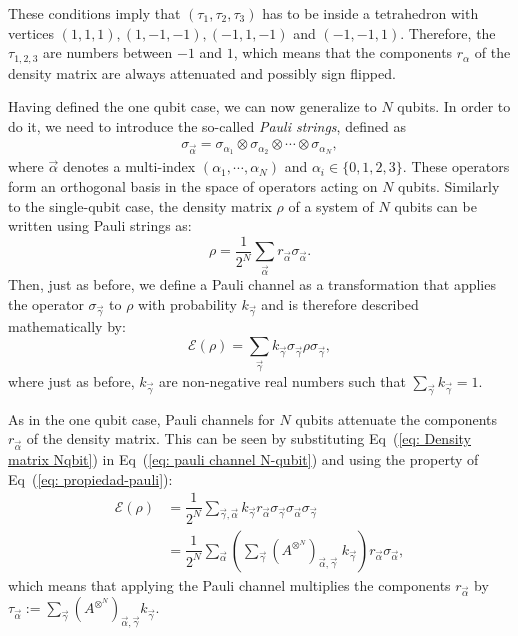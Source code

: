 \documentclass[10pt,letterpaper]{article} %
\newcommand{\eref}[1]{Eq~(\ref{#1})}
\begin{document}
These conditions imply that $(\tau_1,\tau_2,\tau_3)$
has to be inside a tetrahedron with
vertices $(1,1,1), (1,-1,-1),(-1,1,-1)$ and $(-1,-1,1)$. 
Therefore, the $\tau_{1,2,3}$ are numbers between 
$-1$ and $1$, which means that the components
$r_{\alpha}$ of the density matrix are always 
attenuated and possibly sign flipped.

Having defined the one qubit case,  we can now generalize to $N$ qubits.
In order to do it, we need to introduce the so-called \textit{Pauli strings}, defined as
\begin{eqnarray}
\label{eq: Pauli string}
\sigma_{\vec{\alpha}} = \sigma_{\alpha_1} \otimes \sigma_{\alpha_2}\otimes \cdots \otimes \sigma_{\alpha_N},
\end{eqnarray}
where $\vec{\alpha}$ denotes a multi-index $(\alpha_1, \cdots, \alpha_N)$
 and $\alpha_i \in \{0,1,2,3\}$. 
These operators form an orthogonal basis in the space of operators acting on $N$ qubits. 
 Similarly to the single-qubit case, the density matrix $\rho$ 
of a system of $N$ qubits can be written using Pauli strings as:
\begin{equation}
\label{eq:  Density matrix Nqbit}
\rho = \dfrac{1}{2^N} \sum_{\vec{\alpha}} r_{\vec{\alpha}} \sigma_{\vec{\alpha}}.
\end{equation}
Then, just as before, we define a Pauli channel as a transformation that applies 
the operator $\sigma_{\vec{\gamma}}$ to $\rho$ with probability $k_{\vec{\gamma}}$
and is therefore described mathematically by:
\begin{equation}
\label{eq: pauli channel N-qubit}
\mathcal{E}(\rho) = \sum_{\vec{\gamma}} k_{\vec{\gamma}} \sigma_{\vec{\gamma}} \rho \sigma_{\vec{\gamma}},
\end{equation}
where just as before, $k_{\vec{\gamma}}$ are non-negative real numbers such 
that $\sum_{\vec{\gamma}} k_{\vec{\gamma}}=1$.

As in the one qubit case, Pauli channels for $N$ qubits 
attenuate the components $r_{\vec{\alpha}}$ of the density matrix.
This can be seen by substituting \eref{eq:  Density matrix Nqbit} in \eref{eq: pauli channel N-qubit}
and using the property of \eref{eq: propiedad-pauli}:
\begin{align*}
\mathcal{E}(\rho) &= \dfrac{1}{2^N} \sum_{\vec{\gamma},\vec{\alpha}} k_{\vec{\gamma}} r_{\vec{\alpha}} \sigma_{\vec{\gamma}} \sigma_{\vec{\alpha}} \sigma_{\vec{\gamma}} \\
& = \dfrac{1}{2^N} \sum_{\vec{\alpha}} \left( \sum_{\vec{\gamma}} {(A^{\otimes^N})}_{\vec{\alpha},\vec{\gamma}} \; k_{\vec{\gamma}} \right) r_{\vec{\alpha}} \sigma_{\vec{\alpha}},
\end{align*}
which means that applying the Pauli channel multiplies the 
components $r_{\vec{\alpha}}$ by $\tau_{\vec{\alpha}} := \sum_{\vec{\gamma}} {(A^{\otimes^N})}_{\vec{\alpha},\vec{\gamma}} k_{\vec{\gamma}}$.
\end{document}
